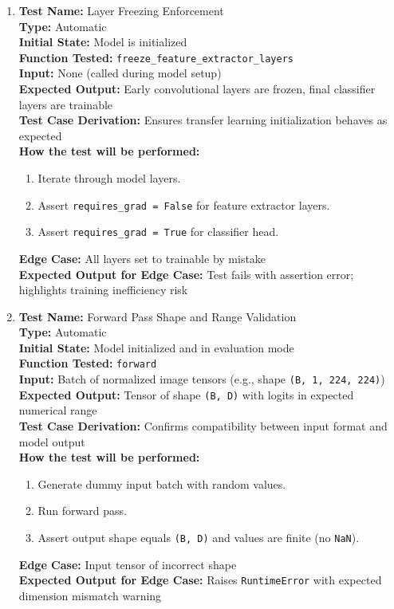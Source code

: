 \documentclass[12pt, titlepage]{article}
\begin{document}
\begin{enumerate}
  \item \textbf{Test Name:} Layer Freezing Enforcement\\
  \textbf{Type:} Automatic\\
  \textbf{Initial State:} Model is initialized\\
  \textbf{Function Tested:} \verb|freeze_feature_extractor_layers|\\
  \textbf{Input:} None (called during model setup)\\
  \textbf{Expected Output:} Early convolutional layers are frozen, final classifier layers are trainable\\
  \textbf{Test Case Derivation:} Ensures transfer learning initialization behaves as expected\\
  \textbf{How the test will be performed:}
  \begin{enumerate}
    \item Iterate through model layers.
    \item Assert \verb|requires_grad = False| for feature extractor layers.
    \item Assert \verb|requires_grad = True| for classifier head.
  \end{enumerate}
  \textbf{Edge Case:} All layers set to trainable by mistake\\
  \textbf{Expected Output for Edge Case:} Test fails with assertion error; highlights training inefficiency risk\\
  \vspace{1em}

  \item \textbf{Test Name:} Forward Pass Shape and Range Validation\\
  \textbf{Type:} Automatic\\
  \textbf{Initial State:} Model initialized and in evaluation mode\\
  \textbf{Function Tested:} \verb|forward|\\
  \textbf{Input:} Batch of normalized image tensors (e.g., shape \verb|(B, 1, 224, 224)|)\\
  \textbf{Expected Output:} Tensor of shape \verb|(B, D)| with logits in expected numerical range\\
  \textbf{Test Case Derivation:} Confirms compatibility between input format and model output\\
  \textbf{How the test will be performed:}
  \begin{enumerate}
    \item Generate dummy input batch with random values.
    \item Run forward pass.
    \item Assert output shape equals \verb|(B, D)| and values are finite (no \verb|NaN|).
  \end{enumerate}
  \textbf{Edge Case:} Input tensor of incorrect shape\\
  \textbf{Expected Output for Edge Case:} Raises \verb|RuntimeError| with expected dimension mismatch warning\\
\end{enumerate}
\end{document}

